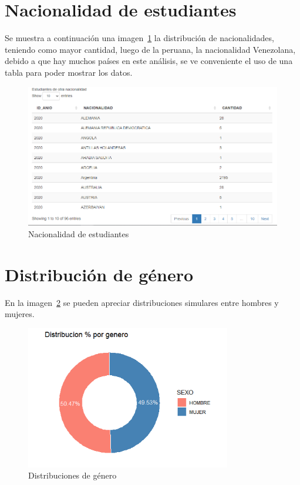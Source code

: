 \section{Nacionalidad de estudiantes}

Se muestra a continuación una imagen~\ref{fig:nacionalidad} la distribución de nacionalidades, teniendo como mayor cantidad, luego de la peruana, la nacionalidad Venezolana, debido a que hay muchos países en este análisis, se ve conveniente el uso de una tabla para poder mostrar los datos.

\begin{figure}[!h]
\centering
\includegraphics[width=1\textwidth]{Figures/nacionalidad}
\decoRule
\caption[Nacionalidad]{Nacionalidad de estudiantes}
\label{fig:nacionalidad}
\end{figure}

\section{Distribución de género}

En la imagen~\ref{fig:genero} se pueden apreciar distribuciones simulares entre hombres y mujeres.

\begin{figure}[!h]
\centering
\includegraphics[width=0.8\textwidth]{Figures/genero}
\decoRule
\caption[Genero]{Distribuciones de género}
\label{fig:genero}
\end{figure}

